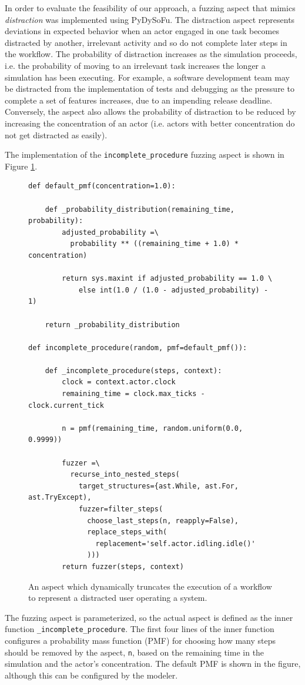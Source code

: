 \documentclass{llncs}
\begin{document}
In order to evaluate the feasibility of our approach, a fuzzing aspect that mimics \emph{distraction} was implemented
using PyDySoFu.  The distraction aspect represents deviations in expected behavior when an actor engaged in one task
becomes distracted by another, irrelevant activity and so do not complete later steps in the workflow.  The probability
of distraction increases as the simulation proceeds, i.e. the probability of moving to an irrelevant task increases the
longer a simulation has been executing.  For example, a software development team may be distracted from the
implementation of tests and debugging as the pressure to complete a set of features increases, due to an impending
release deadline.  Conversely, the aspect also allows the probability of distraction to be reduced by increasing the
concentration of an actor (i.e. actors with better concentration do not get distracted as easily).

The implementation of the \lstinline!incomplete_procedure! fuzzing aspect is shown in Figure
\ref{fig:distraction-fuzzer}.%
\begin{figure}[t]
  \centering
\begin{lstlisting}
def default_pmf(concentration=1.0):

    def _probability_distribution(remaining_time, probability):
        adjusted_probability =\
          probability ** ((remaining_time + 1.0) * concentration)

        return sys.maxint if adjusted_probability == 1.0 \
            else int(1.0 / (1.0 - adjusted_probability) - 1)

    return _probability_distribution

def incomplete_procedure(random, pmf=default_pmf()):

    def _incomplete_procedure(steps, context):
        clock = context.actor.clock
        remaining_time = clock.max_ticks - clock.current_tick

        n = pmf(remaining_time, random.uniform(0.0, 0.9999))

        fuzzer =\
          recurse_into_nested_steps(
            target_structures={ast.While, ast.For, ast.TryExcept),
            fuzzer=filter_steps(
              choose_last_steps(n, reapply=False),
              replace_steps_with(
                replacement='self.actor.idling.idle()'
              )))
        return fuzzer(steps, context)
\end{lstlisting}
  \caption{An aspect which dynamically truncates the execution of a workflow to represent a distracted user operating a
    system.}
  \label{fig:distraction-fuzzer}
\end{figure}
The fuzzing aspect is parameterized, so the actual aspect is defined as the inner
function \lstinline!_incomplete_procedure!.  The first four lines of the inner function configures a probability mass
function (PMF) for choosing how many steps should be removed by the aspect, \lstinline!n!, based on the remaining time
in the simulation and the actor's concentration. The default PMF is shown in the figure, although this can be configured
by the modeler.
\end{document}
